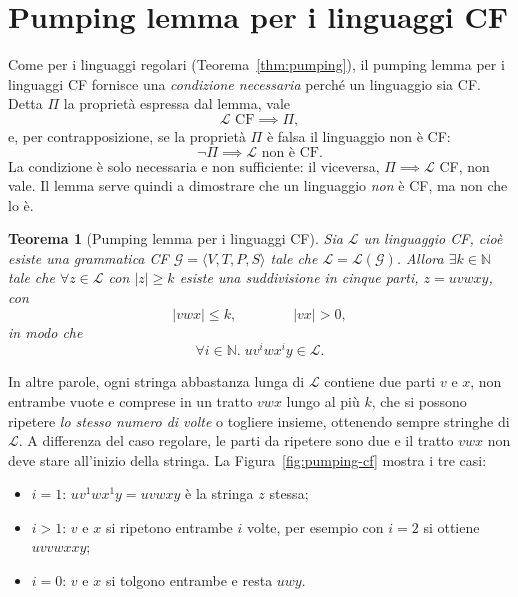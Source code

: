 \documentclass[a4paper, 11pt, oneside]{book}
\theoremstyle{formale}
\newtheorem{theorem}{Teorema}
\begin{document}
    \section{Pumping lemma per i linguaggi CF}
    \label{sec:pumping-cf}
    Come per i linguaggi regolari (Teorema~\ref{thm:pumping}), il pumping lemma per i
    linguaggi CF fornisce una \emph{condizione necessaria} perch\'e un linguaggio sia CF.
    Detta $\Pi$ la propriet\`a espressa dal lemma, vale
    \begin{equation*}
        \mathcal{L} \text{ CF} \implies \Pi,
    \end{equation*}
    e, per contrapposizione, se la propriet\`a $\Pi$ \`e falsa il linguaggio non \`e CF:
    \begin{equation*}
        \neg \Pi \implies \mathcal{L} \text{ non \`e CF}.
    \end{equation*}
    La condizione \`e solo necessaria e non sufficiente: il viceversa,
    $\Pi \implies \mathcal{L}$ CF, non vale. Il lemma serve quindi a dimostrare che un
    linguaggio \emph{non} \`e CF, ma non che lo \`e.

    \begin{theorem}[Pumping lemma per i linguaggi CF]
        \label{thm:pumping-cf}
        Sia $\mathcal{L}$ un linguaggio CF, cio\`e esiste una grammatica CF
        $\mathcal{G} = \langle V, T, P, S \rangle$ tale che
        $\mathcal{L} = \mathcal{L}(\mathcal{G})$. Allora $\exists k \in \mathbb{N}$ tale
        che $\forall z \in \mathcal{L}$ con $|z| \geq k$ esiste una suddivisione in
        cinque parti, $z = uvwxy$, con
        \begin{equation*}
            |vwx| \leq k,
            \qquad\qquad
            |vx| > 0,
        \end{equation*}
        in modo che
        \begin{equation*}
            \forall i \in \mathbb{N}.\; uv^i w x^i y \in \mathcal{L}.
        \end{equation*}
    \end{theorem}
    In altre parole, ogni stringa abbastanza lunga di $\mathcal{L}$ contiene due parti
    $v$ e $x$, non entrambe vuote e comprese in un tratto $vwx$ lungo al pi\`u $k$, che
    si possono ripetere \emph{lo stesso numero di volte} o togliere insieme, ottenendo
    sempre stringhe di $\mathcal{L}$. A differenza del caso regolare, le parti da ripetere
    sono due e il tratto $vwx$ non deve stare all'inizio della stringa. La
    Figura~\ref{fig:pumping-cf} mostra i tre casi:
    \begin{itemize}
        \item $i = 1$: $uv^1 w x^1 y = uvwxy$ \`e la stringa $z$ stessa;
        \item $i > 1$: $v$ e $x$ si ripetono entrambe $i$ volte, per esempio con $i = 2$
            si ottiene $uvvwxxy$;
        \item $i = 0$: $v$ e $x$ si tolgono entrambe e resta $uwy$.
    \end{itemize}
\end{document}
